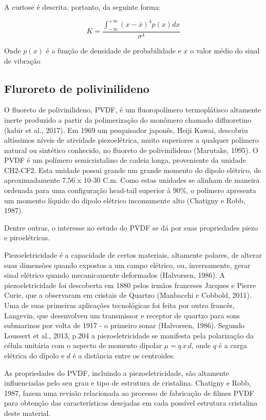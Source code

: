 \documentclass[
	12pt,				
	oneside,			
	a4paper,			
	english,			
	brazil				
	]{abntex2ppgsi}
\begin{document}
A curtose é descrita, portanto, da seguinte forma:

\[K = \frac{ \int_{-\infty}^{+\infty} (x - \overline{x})^{4}p(x)dx } {\sigma^{4}} \]

Onde $p(x)$ é a função de densidade de probabilidade e $\overline{x}$ o valor médio do sinal de vibração 

\subsection{\textbf{Fluroreto de polivinilideno}}

O fluoreto de polivinilideno, PVDF, é um fluoropolímero termoplátisco altamente inerte produzido a partir da polimerização do monômero chamado difluoretino (kabir et al., 2017). Em 1969 um pesquisador japonês, Heiji Kawai, descobriu altíssimos níveis de atividade piezoelétrica, muito superiores a qualquer polímero natural ou sintético conhecido, no fluoreto de polivinilideno (Marutake, 1995). O PVDF é um polímero semicristalino de cadeia longa, proveniente da unidade CH2-CF2. Esta unidade possui grande um grande momento do dipolo elétrico, de aproximadamente 7,56 x 10-30 C.m. Como estas unidades se alinham de maneira ordenada para uma configuração head-tail superior à 90\%, o polímero apresenta um momento líquido do dipolo elétrico incomumente alto (Chatigny e Robb, 1987).

Dentre outras, o interesse no estudo do PVDF se dá por suas propriedades piezo e piroelétricas. 

Piezoeletricidade é a capacidade de certos materiais, altamente polares, de alterar suas dimensões quando expostos a um campo elétrico, ou, inversamente, gerar sinal elétrico quando mecanicamente deformados (Halvorsen, 1986). A piezoeletricidade foi descoberta em 1880 pelos irmãos franceses Jacques e Pierre Curie, que a observaram em cristais de Quartzo (Manbacchi e Cobbold, 2011). Uma de suas primeiras aplicações tecnológicas foi feita por outro francês, Langevin, que desenvolveu um transmissor e receptor de quartzo para sons submarinos por volta de 1917 - o primeiro sonar (Halvorsen, 1986). Segundo Loussert et al., 2013, p.204 a piezoeletricidade se manifesta pela polarização da célula unitária com o aspecto de momento dipolar $\mu = q \,x \, d$, onde $q$ é a carga elétrica do dípolo e $d$ é a distância entre os centroides.  

As propriedades do PVDF, incluindo a piezoeletricidade, são altamente influenciadas pelo seu grau e tipo de estrutura de cristalina. Chatigny e Robb, 1987, fazem uma revisão relacionada ao processo de fabricação de filmes PVDF para obtenção das características desejadas em cada possível estrutura cristalina deste material. 
\end{document}

